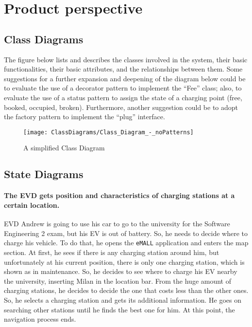 \section{Product perspective}
\label{sec:product_perspective}%

\subsection{Class Diagrams}
\label{subsec:class_diagrams}%
The figure below lists and describes the classes involved in the system, their basic functionalities, their basic attributes,
and the relationships between them.
Some suggestions for a further expansion and deepening of the diagram below could be to evaluate the use of a decorator
pattern to implement the ``Fee'' class;
also, to evaluate the use of a status pattern to assign the state of a charging point (free, booked, occupied, broken).
Furthermore, another suggestion could be to adopt the factory pattern to implement the ``plug'' interface.
\begin{figure}[H]
    \begin{center}
        \texttt{[image: ClassDiagrams/Class\_Diagram\_-\_noPatterns]}
        \caption{A simplified Class Diagram}
        \label{fig:class_diagram}
    \end{center}
\end{figure}

\subsection{State Diagrams}
\label{subsec:state_diagrams}%

\paragraph{The EVD gets position and characteristics of charging stations at a certain location.}
EVD Andrew is going to use his car to go to the university for the Software Engineering 2 exam, but his EV is out of battery.
So, he needs to decide where to charge his vehicle.
To do that, he opens the \verb|eMALL| application and enters the map section.
At first, he sees if there is any charging station around him, but unfortunately at his current position,
there is only one charging station, which is shown as in maintenance.
So, he decides to see where to charge his EV nearby the university, inserting Milan in the location bar.
From the huge amount of charging stations, he decides to decide the one that costs less than the other ones.
So, he selects a charging station and gets its additional information.
He goes on searching other stations until he finds the best one for him.
At this point, the navigation process ends.

